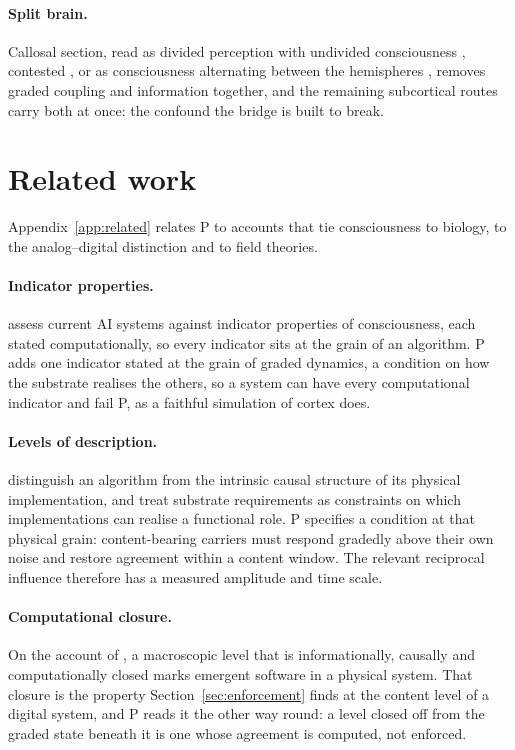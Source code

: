 \documentclass[12pt]{article}
\begin{document}
\paragraph{Split brain.} Callosal section, read as divided perception with
undivided consciousness \citep{pinto2017}, contested \citep{dehaan2020}, or as
consciousness alternating between the hemispheres \citep{bayne2010}, removes
graded coupling and information together, and the remaining subcortical routes
carry both at once: the confound the bridge is built to break.

\section{Related work}
\label{sec:related}

Appendix~\ref{app:related} relates P to accounts that tie consciousness to
biology, to the analog--digital distinction and to field theories.

\paragraph{Indicator properties.} \citet{butlin2023} assess current AI systems
against indicator properties of consciousness, each stated computationally, so
every indicator sits at the grain of an algorithm. P adds one indicator stated
at the grain of graded dynamics, a condition on how the substrate realises the
others, so a system can have every computational indicator and fail P, as a
faithful simulation of cortex does.

\paragraph{Levels of description.} \citet{chandaria2026} distinguish an
algorithm from the intrinsic causal structure of its physical implementation,
and treat substrate requirements as constraints on which implementations can
realise a functional role. P specifies a condition at that physical grain:
content-bearing carriers must respond gradedly above their own noise and
restore agreement within a content window. The relevant reciprocal influence
therefore has a measured amplitude and time scale.

\paragraph{Computational closure.} On the account of \citet{rosas2024}, a
macroscopic level that is informationally, causally and computationally closed
marks emergent software in a physical system. That closure is the property
Section~\ref{sec:enforcement} finds at the content level of a digital system,
and P reads it the other way round: a level closed off from the graded state
beneath it is one whose agreement is computed, not enforced.
\end{document}
